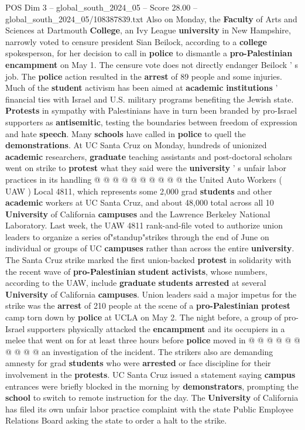 \begin{textsample}{POS Dim 3 – global\_south\_2024\_05 – Score 28.00 – global\_south\_2024\_05/108387839.txt}
Also on Monday, the \textbf{Faculty} of Arts and Sciences at Dartmouth \textbf{College}, an Ivy League \textbf{university} in New Hampshire, narrowly voted to censure president Sian Beilock, according to a \textbf{college} spokesperson, for her decision to call in \textbf{police} to dismantle a \textbf{pro-Palestinian} \textbf{encampment} on May 1.
The censure vote does not directly endanger Beilock ' s job.
The \textbf{police} action resulted in the \textbf{arrest} of 89 people and some injuries.
Much of the \textbf{student} activism has been aimed at \textbf{academic} \textbf{institutions} ' financial ties with Israel and U.S. military programs benefiting the Jewish state. \textbf{Protests} in sympathy with Palestinians have in turn been branded by pro-Israel supporters as \textbf{antisemitic}, testing the boundaries between freedom of expression and hate \textbf{speech}.
Many \textbf{schools} have called in \textbf{police} to quell the \textbf{demonstrations}.
At UC Santa Cruz on Monday, hundreds of unionized \textbf{academic} researchers, \textbf{graduate} teaching assistants and post-doctoral scholars went on strike to \textbf{protest} what they said were the \textbf{university} ' s unfair labor practices in its handling @ @ @ @ @ @ @ @ @ @ the United Auto Workers ( UAW ) Local 4811, which represents some 2,000 grad \textbf{students} and other \textbf{academic} workers at UC Santa Cruz, and about 48,000 total across all 10 \textbf{University} of California \textbf{campuses} and the Lawrence Berkeley National Laboratory.
Last week, the UAW 4811 rank-and-file voted to authorize union leaders to organize a series of"standup"strikes through the end of June on individual or groups of UC \textbf{campuses} rather than across the entire \textbf{university}.
The Santa Cruz strike marked the first union-backed \textbf{protest} in solidarity with the recent wave of \textbf{pro-Palestinian} \textbf{student} \textbf{activists}, whose numbers, according to the UAW, include \textbf{graduate} \textbf{students} \textbf{arrested} at several \textbf{University} of California \textbf{campuses}.
Union leaders said a major impetus for the strike was the \textbf{arrest} of 210 people at the scene of a \textbf{pro-Palestinian} \textbf{protest} camp torn down by \textbf{police} at UCLA on May 2.
The night before, a group of pro-Israel supporters physically attacked the \textbf{encampment} and its occupiers in a melee that went on for at least three hours before \textbf{police} moved in @ @ @ @ @ @ @ @ @ @ an investigation of the incident.
The strikers also are demanding amnesty for grad \textbf{students} who were \textbf{arrested} or face discipline for their involvement in the \textbf{protests}.
UC Santa Cruz issued a statement saying \textbf{campus} entrances were briefly blocked in the morning by \textbf{demonstrators}, prompting the \textbf{school} to switch to remote instruction for the day.
The \textbf{University} of California has filed its own unfair labor practice complaint with the state Public Employee Relations Board asking the state to order a halt to the strike.


\end{textsample}
